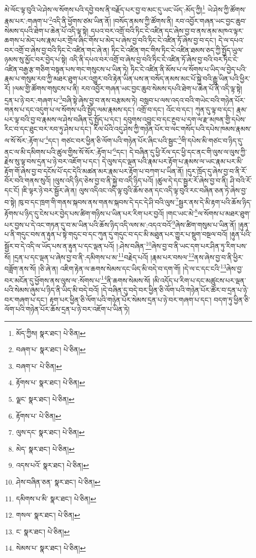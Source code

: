 མེ་ལོང་ལྟ་བུའི་ཡེ་ཤེས་ལ་སོགས་པའི་དབྱེ་བས་ནི་བརྗོད་པར་བྱ་བ་མང་དུ་ཡང་ཡོད་:མོད་ཀྱི།\footnote{མོད་ཀྱིས།  སྣར་ཐང་།  པེ་ཅིན། } ཡེ་ཤེས་ཀྱི་ཚོགས་རྣམ་པར་:གཞག་པ་\footnote{བཞག་པ་  སྣར་ཐང་།  པེ་ཅིན། }འདི་ནི་ཕྱོགས་ཙམ་ཡིན་ནོ། །བསོད་ནམས་ཀྱི་ཚོགས་ནི། རབ་འབྱོར་གཞན་ཡང་བྱང་ཆུབ་སེམས་དཔའི་ཐེག་པ་ཆེན་པོ་འདི་ལྟ་སྟེ། དཔའ་བར་འགྲོ་བའི་ཏིང་ངེ་འཛིན་དང་ཞེས་བྱ་བ་ནས་ནམ་མཁའ་ལྟར་ཆགས་པ་མེད་པས་རྣམ་པར་གྲོལ་ཞིང་གོས་པ་མེད་པ་ཞེས་བྱ་བའི་ཏིང་ངེ་འཛིན་ཏོ་ཞེས་བྱ་བ་དང་། དེ་ལ་དཔའ་བར་འགྲོ་བ་ཞེས་བྱ་བའི་ཏིང་ངེ་འཛིན་གང་ཞེ་ན། ཏིང་ངེ་འཛིན་གང་གིས་ཏིང་ངེ་འཛིན་ཐམས་ཅད་ཀྱི་སྤྱོད་ཡུལ་ཉམས་སུ་མྱོང་བར་བྱེད་པ་སྟེ། འདི་ནི་དཔའ་བར་འགྲོ་བ་ཞེས་བྱ་བའི་ཏིང་ངེ་འཛིན་ཏོ་ཞེས་བྱ་བའི་བར་ཏིང་ངེ་འཛིན་བརྒྱ་རྩ་གཅིག་བསྟན་པས་གང་གསུངས་པ་ཡིན་ཏེ། ཏིང་ངེ་འཛིན་ནི་མོས་པ་ལ་སོགས་པ་ཡིད་ལ་བྱེད་པའི་རྣམ་པ་གསུམ་རབ་ཀྱི་མཐར་ཐུག་པར་འགྱུར་བའི་རྟེན་ཡིན་པས་ན་བསོད་ནམས་མང་པོ་སྐྱེ་བའི་རྒྱུ་ཡིན་པའི་ཕྱིར་རོ། །ལམ་གྱི་ཚོགས་གསུངས་པ་ནི། རབ་འབྱོར་གཞན་ཡང་བྱང་ཆུབ་སེམས་དཔའི་ཐེག་པ་ཆེན་པོ་ནི་འདི་ལྟ་སྟེ། དྲན་པ་ཉེ་བར་:གཞག་པ་\footnote{བཞག་པ་  པེ་ཅིན། }བཞི་སྟེ་ཞེས་བྱ་བ་ནས་བརྩམས་ཏེ། བསླབ་པ་ལས་འདའ་བའི་གཡེང་བའི་གཉེན་པོར་གནས་པ་དང་འདུག་པ་ལ་སོགས་པའི་སྤྱོད་ལམ་རྣམས་དང་། འགྲོ་བ་དང་། འོང་བ་དང་། ཀུན་དུ་ལྟ་བ་དང་། རྣམ་པར་ལྟ་བའི་བྱ་བ་རྣམས་ལ་ཤེས་བཞིན་དུ་སྤྱོད་པ་དང་། དབུགས་འབྱུང་བ་དང་རྔུབ་པ་དག་ལ་རྫ་མཁན་གྱི་དཔེས་རིང་བ་དང་ཐུང་བར་རབ་ཏུ་ཤེས་པ་དང་། རིལ་པོའི་འདུ་ཤེས་ཀྱི་གཉེན་པོར་བ་ལང་གསོད་པའི་དཔེས་ཁམས་རྣམས་ལ་སོ་སོར་:རྟོག་པ་\footnote{རྟོགས་པ་  སྣར་ཐང་།  པེ་ཅིན། }དང་། གཙང་བར་ཕྱིན་ཅི་ལོག་པའི་གཉེན་པོར་ཞིང་པའི་སྦྱང་\footnote{ལྗང་  སྣར་ཐང་།  པེ་ཅིན། }གི་དཔེས་མི་གཙང་བ་ཉིད་དུ་ནང་ལ་མི་དམིགས་པའི་ཚུལ་གྱིས་སོ་སོར་:རྟོག་པ་\footnote{རྟོགས་པ་  པེ་ཅིན། }དང་། དེ་བཞིན་དུ་ཕྱི་རོལ་དང་ཕྱི་དང་ནང་གི་ལུས་ལ་ལུས་ཀྱི་རྗེས་སུ་ལྟ་བས་དྲན་པ་ཉེ་བར་འཇོག་པ་དང་། དེ་ལུས་དང་ལྡན་པའི་རྣམ་པར་རྟོག་པ་རྣམས་ལ་ཡང་རྣམ་པར་མི་རྟོག་གོ་ཞེས་བྱ་བ་དངོས་པོ་དང་དེའི་མཚན་མར་རྣམ་པར་རྟོག་པ་བཀག་པ་ཡིན་ནོ། །དུར་ཁྲོད་དུ་ཞེས་བྱ་བ་ནི་རོ་བོར་བའི་གནས་སུའོ། །ལུས་འདི་ཉིད་ཅེས་བྱ་བ་ནི་སྐྱེ་བ་འདི་ཉིད་པའོ། །ཚུལ་དེ་དང་སྦྱར་རོ་ཞེས་བྱ་བ་ནི། ཤི་བའི་རོ་དང་ངོ། །ཇི་ལྟར་ཉེ་བར་སྦྱོར་ཞེ་ན། ལུས་འདིའང་འདི་ལྟ་བུའི་ཆོས་ཅན་དང་འདི་ལྟ་བུའི་རང་བཞིན་ཅན་ཏེ་ཞེས་བྱ་བ་སྟེ། ཁུ་བ་དང་ཁྲག་གི་གནས་སྐབས་ནས་གནས་སྐབས་དེ་དང་དེ་ཤི་བའི་ལུས་\footnote{ལུས་དང་  སྣར་ཐང་།  པེ་ཅིན། }སྦྱར་ནས་དེ་མི་རྟག་པའི་ཆོས་ཉིད་རྟོགས་པ་ཉིད་དུ་ངེས་པར་བྱེད་པས་ཚིག་གཉིས་པ་ཡིན་པར་རིག་པར་བྱའོ། །གང་ཡང་མེ་\footnote{མེད་  སྣར་ཐང་།  པེ་ཅིན། }ལ་སོགས་པ་མཐར་ཐུག་པར་བྱས་པ་དེ་འང་གཏན་དུ་བ་མ་ཡིན་པའི་ཆོས་ཉིད་འདི་ལས་མ་:འདའ་བའོ་\footnote{འདས་པའོ་  སྣར་ཐང་།  པེ་ཅིན། }ཞེས་ཚིག་གསུམ་པ་ཡིན་ནོ། །རྟུན་པ་ནི་གདུང་བས་ན་རྟུན་པ་སྟེ་གདུང་བ་དང་ཀུན་དུ་གདུང་བ་དང་མི་མཐུན་པར་གྱུར་པ་སྡུག་བསྔལ་བའོ། །རྟུན་པའི་སྦྱོར་བ་དེ་འདི་ལ་ཡོད་པས་ན་རྟུན་པ་དང་ལྡན་པའོ། །:ཤེས་བཞིན་\footnote{ཤེས་བཞིན་ཅན་  སྣར་ཐང་།  པེ་ཅིན། }ཞེས་བྱ་བ་ནི་ཡང་དག་པར་ཤིན་ཏུ་རིག་པས་སོ། །དྲན་པ་དང་ལྡན་པ་ཞེས་བྱ་བ་ནི་:དམིགས་པ་མ་\footnote{དམིགས་པ་མི་  སྣར་ཐང་།  པེ་ཅིན། }བརྗེད་པའོ། །རྣམ་པར་བསལ་\footnote{གསལ་  སྣར་ཐང་།  པེ་ཅིན། }ནས་ཞེས་བྱ་བ་ནི་ཕྱིར་བཟློག་ནས་སོ། །ཅི་ཞེ་ན། འཇིག་རྟེན་ལ་ཆགས་སེམས་དང་ཡིད་མི་བདེ་བ་དག་གོ། །དེ་ལ་ང་དང་ངའི་\footnote{ང་  སྣར་ཐང་།  པེ་ཅིན། }ཞེས་བྱ་བར་མངོན་དུ་ཕྱོགས་ནས་ལུས་ལ་:སོགས་པ་\footnote{སེམས་པ་  སྣར་ཐང་།  པེ་ཅིན། }ནི་ཆགས་སེམས་སོ། །མི་འདོད་པ་རིག་པ་དང་མཚུངས་པར་ལྡན་པའི་སེམས་ཞུམ་པ་ཉིད་ནི་ཡིད་མི་བདེ་བའོ། །དེ་བཞིན་དུ་བདེ་བར་ཕྱིན་ཅི་ལོག་པའི་གཉེན་པོར་ཚོར་བ་དྲན་པ་ཉེ་བར་གཞག་པ་དང་། རྟག་པར་ཕྱིན་ཅི་ལོག་པའི་གཉེན་པོར་སེམས་དྲན་པ་ཉེ་བར་གཞག་པ་དང་། བདག་ཏུ་ཕྱིན་ཅི་ལོག་པའི་གཉེན་པོར་ཆོས་དྲན་པ་ཉེ་བར་འཇོག་པ་ཡིན་ཏེ། 
